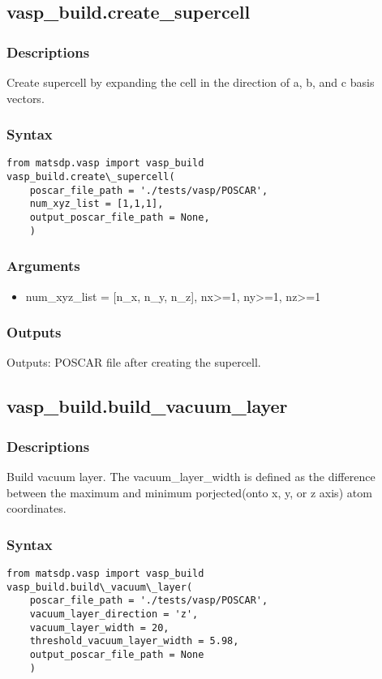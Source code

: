 \documentclass[12pt]{book}
\begin{document}
\subsection{vasp\_build.create\_supercell}
\subsubsection{Descriptions}
Create supercell by expanding the cell in the direction of a, b, and c basis vectors.
\subsubsection{Syntax}
\begin{lstlisting}
from matsdp.vasp import vasp_build
vasp_build.create\_supercell(
    poscar_file_path = './tests/vasp/POSCAR', 
    num_xyz_list = [1,1,1], 
    output_poscar_file_path = None,
    )
\end{lstlisting}

\subsubsection{Arguments}
\begin{itemize}
\item num\_xyz\_list = [n\_x, n\_y, n\_z], nx>=1, ny>=1, nz>=1
\end{itemize}

\subsubsection{Outputs}
Outputs: POSCAR file after creating the supercell.


\subsection{vasp\_build.build\_vacuum\_layer}
\subsubsection{Descriptions}
Build vacuum layer. The vacuum\_layer\_width is defined as the difference between the maximum and minimum porjected(onto x, y, or z axis) atom coordinates.

\subsubsection{Syntax}
\begin{lstlisting}
from matsdp.vasp import vasp_build
vasp_build.build\_vacuum\_layer(
    poscar_file_path = './tests/vasp/POSCAR', 
    vacuum_layer_direction = 'z', 
    vacuum_layer_width = 20, 
    threshold_vacuum_layer_width = 5.98, 
    output_poscar_file_path = None
    )
\end{lstlisting}
\end{document}
